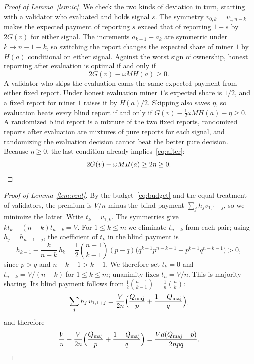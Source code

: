 \documentclass[sigconf,anonymous,review]{acmart}
\numberwithin{equation}{section}
\newcommand{\Qmaj}{Q_{\mathrm{maj}}}
\begin{document}
\begin{proof}[Proof of Lemma~\ref{lem:ic}]
We check the two kinds of deviation in turn, starting with a validator who
evaluated and holds signal $s$. The symmetry
$v_{0,k}=v_{1,n-k}$ makes the expected payment of reporting $s$ exceed that of
reporting $1-s$ by $2G(v)$ for either signal. The increments
$a_{k+1}-a_k$ are symmetric under $k\mapsto n-1-k$, so switching the report
changes the expected share of miner $1$ by $H(a)$ conditional on either signal.
Against the worst sign of ownership, honest reporting after evaluation is
optimal if and only if
\begin{equation}\label{eq:after}
2G(v)-\omega MH(a)\ge0 .
\end{equation}
A validator who skips the evaluation earns the same expected payment from
either fixed report. Under honest evaluation miner $1$'s expected share is
$1/2$, and a fixed report for miner $1$ raises it by $H(a)/2$. Skipping also
saves $\eta$, so evaluation beats every blind report if and only if
$G(v)-\frac12\omega MH(a)-\eta\ge0$. A randomized blind report is a mixture of
the two fixed reports, randomized reports after evaluation are mixtures of pure
reports for each signal, and randomizing the evaluation decision cannot beat
the better pure decision. Because $\eta\ge0$, the last condition already
implies~\eqref{eq:after}:
\[
2G(v)-\omega MH(a)\ge2\eta\ge0 .\qedhere
\]
\end{proof}

\begin{proof}[Proof of Lemma~\ref{lem:rent}]
By the budget~\eqref{eq:budget} and the equal treatment of validators, the
premium is $V/n$ minus the blind payment $\sum_jh_jv_{1,1+j}$, so we minimize
the latter. Write $t_k=v_{1,k}$. The symmetries give
$kt_k+(n-k)t_{n-k}=V$. For $1\le k\le m$ we eliminate $t_{n-k}$ from each pair;
using $h_j=h_{n-1-j}$, the coefficient of $t_k$ in the blind payment is
\[
h_{k-1}-\frac{k}{n-k}\,h_k=\frac12\binom{n-1}{k-1}(p-q)\bigl(q^{k-1}p^{n-k-1}-p^{k-1}q^{n-k-1}\bigr)>0,
\]
since $p>q$ and $n-k-1>k-1$. We therefore set $t_k=0$ and $t_{n-k}=V/(n-k)$ for
$1\le k\le m$; unanimity fixes $t_n=V/n$. This is majority sharing. Its blind
payment follows from $\frac1k\binom{n-1}{k-1}=\frac1n\binom nk$:
\[
\sum_jh_j\,v_{1,1+j}=\frac{V}{2n}\Bigl(\frac{\Qmaj}{p}+\frac{1-\Qmaj}{q}\Bigr),
\]
and therefore
\[
\frac Vn-\frac{V}{2n}\Bigl(\frac{\Qmaj}{p}+\frac{1-\Qmaj}{q}\Bigr)=\frac{Vd(\Qmaj-p)}{2npq}.
\qedhere
\]
\end{proof}
\end{document}

